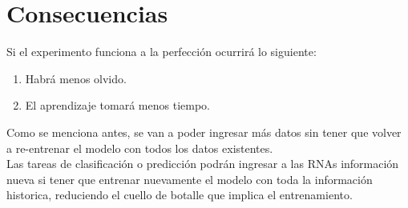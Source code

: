 \section{Consecuencias}

    Si el experimento funciona a la perfección ocurrir\'a lo siguiente:
    \begin{enumerate}
        \item Habrá menos olvido.
        \item El aprendizaje tomará menos tiempo.
    \end{enumerate}

    Como se menciona antes, se van a poder ingresar m\'as datos sin 
    tener que volver a re-entrenar el modelo con todos los datos existentes.\\
    
    Las tareas de clasificación o predicción podrán ingresar a las RNAs información nueva si tener que entrenar nuevamente el modelo con toda la información historica, reduciendo el cuello de botalle que implica el entrenamiento. 
